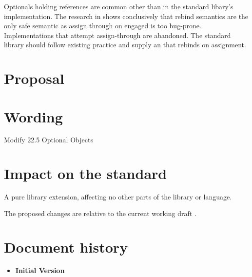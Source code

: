 \documentclass[a4paper,10pt,oneside,openany,final,article]{memoir}
\begin{document}
Optionals holding references are common other than in the standard libary's implementation. The research in \cite{P1683R0} shows conclusively that rebind semantics are the only safe semantic as assign through on engaged is too bug-prone. Implementations that attempt assign-through are abandoned. The standard library should follow existing practice and supply an  that rebinds on assignment.

\chapter{Proposal}



\chapter{Wording}


\begin{wording}

Modify 22.5 Optional Objects


\end{wording}

\chapter{Impact on the standard}

A pure library extension, affecting no other parts of the library or language.

The proposed changes are relative to the current working draft \cite{N4910}.

\chapter*{Document history}

\begin{itemize}
\item \textbf{Initial Version}
\end{itemize}

\renewcommand{\bibname}{References}


\end{document}
